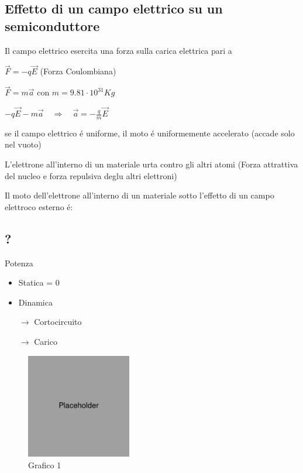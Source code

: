 \documentclass{article}
\begin{document}
\subsection{Effetto di un campo elettrico su un semiconduttore}
Il campo elettrico esercita una forza sulla carica elettrica pari a

$\vec{F} = -q\vec{E}$ (Forza Coulombiana)

$\vec{F} = m\vec{a}$ con $m=9.81\cdot 10^{31}Kg$

$-q\vec{E} - m\vec{a} \quad \Rightarrow \quad \vec{a} = -\frac{q}{m}\vec{E}$

se il campo elettrico \'e uniforme, il moto \'e uniformemente accelerato (accade solo nel vuoto)

L'elettrone all'interno di un materiale urta contro gli altri atomi (Forza attrattiva del nucleo e forza repulsiva deglu altri elettroni)

Il moto dell'elettrone all'interno di un materiale sotto l'effetto di un campo elettroco esterno \'e:



\subsection{?}

Potenza
\begin{itemize}
    \item Statica = 0
    \item Dinamica

        $\rightarrow$ Cortocircuito

        $\rightarrow$ Carico
\end{itemize}

\begin{figure}[ht]
    \centering
    \includegraphics[width=1.8in]{placeholder.jpg}
    \caption{Grafico 1}
\end{figure}
\end{document}
